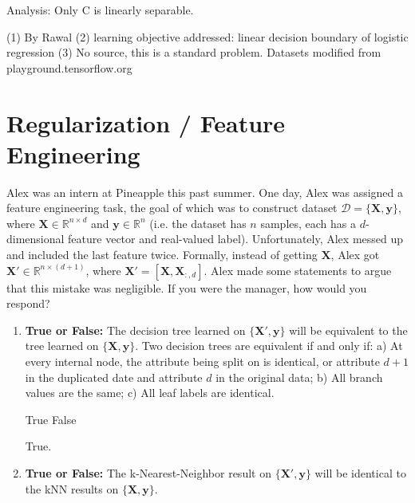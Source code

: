 \begin{questions}
\begin{soln}
    Analysis:
    Only C is linearly separable.
    
    \end{soln}
    \begin{qauthor}
    (1) By Rawal 
    (2) learning objective addressed: linear decision boundary of logistic regression 
    (3) No source, this is a standard problem. Datasets modified from playground.tensorflow.org
    \end{qauthor}

\end{questions}

\section{Regularization / Feature Engineering}
\begin{questions}

\question [] Alex was an intern at Pineapple this past summer. One day, Alex was assigned a feature engineering task, the goal of which was to construct dataset $\mathcal{D} = \{\mathbf{X}, \mathbf{y}\}$, where $\mathbf{X} \in \mathbb{R}^{n \times d}$ and $\mathbf{y} \in \mathbb{R}^{n}$ (i.e. the dataset has $n$ samples, each has a $d$-dimensional feature vector and real-valued label). Unfortunately, Alex messed up and included the last feature twice. Formally, instead of getting $\mathbf{X}$, Alex got $\mathbf{X'} \in \mathbb{R}^{n \times (d + 1)}$, where $\mathbf{X'} = [\mathbf{X}, \mathbf{X}_{:, d}]$. Alex made some statements to argue that this mistake was negligible. If you were the manager, how would you respond?

\begin{enumerate} [label=(\roman*)]
\item \textbf{True or False:} The decision tree learned on $\{\mathbf{X'}, \mathbf{y} \}$ will be equivalent to the tree learned on $\{ \mathbf{X}, \mathbf{y} \}$. Two decision trees are equivalent if and only if: a) At every internal node, the attribute being split on is identical, or attribute $d + 1$ in the duplicated date and attribute $d$ in the original data; b) All branch values are the same; c) All leaf labels are identical.

\begin{checkboxes}
     \choice True 
     \choice False
    \end{checkboxes}
    \begin{soln}
    True.
    \end{soln}

\item \textbf{True or False:} The k-Nearest-Neighbor result on $\{\mathbf{X'}, \mathbf{y} \}$ will be identical to the kNN results on $\{ \mathbf{X}, \mathbf{y} \}$. 


\end{enumerate}
\end{questions}

